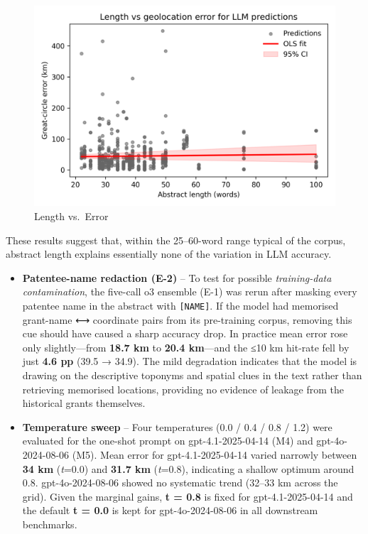 \begin{figure}
\centering
\includegraphics[width=\textwidth,height=0.8\textheight,keepaspectratio]{figures/length_vs_error.png}
\caption{Length vs.~Error}\label{fig:length-vs-error}
\end{figure}

These results suggest that, within the 25--60-word range typical of the
corpus, abstract length explains essentially none of the variation in
LLM accuracy.

\begin{itemize}
\item
  \textbf{Patentee-name redaction (E-2)} -- To test for possible
  \emph{training-data contamination}, the five-call o3 ensemble (E-1)
  was rerun after masking every patentee name in the abstract with
  \passthrough{\lstinline![NAME]!}. If the model had memorised
  grant-name ⟷ coordinate pairs from its pre-training corpus, removing
  this cue should have caused a sharp accuracy drop. In practice mean
  error rose only slightly---from \textbf{18.7 km} to \textbf{20.4
  km}---and the ≤10 km hit-rate fell by just \textbf{4.6 pp} (39.5 →
  34.9). The mild degradation indicates that the model is drawing on the
  descriptive toponyms and spatial clues in the text rather than
  retrieving memorised locations, providing no evidence of leakage from
  the historical grants themselves.
\item
  \textbf{Temperature sweep} -- Four temperatures (0.0 / 0.4 / 0.8 /
  1.2) were evaluated for the one-shot prompt on gpt-4.1-2025-04-14 (M4)
  and gpt-4o-2024-08-06 (M5). Mean error for gpt-4.1-2025-04-14 varied
  narrowly between \textbf{34 km} (\emph{t}=0.0) and \textbf{31.7 km}
  (\emph{t}=0.8), indicating a shallow optimum around 0.8.
  gpt-4o-2024-08-06 showed no systematic trend (32--33 km across the
  grid). Given the marginal gains, \textbf{t = 0.8} is fixed for
  gpt-4.1-2025-04-14 and the default \textbf{t = 0.0} is kept for
  gpt-4o-2024-08-06 in all downstream benchmarks.
\end{itemize}

